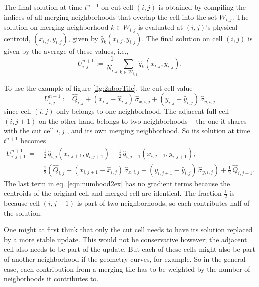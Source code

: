 \begin{enumerate}
\vspace*{.1in}
The final solution at time $t^{n+1}$ on cut cell $(i,j)$ is obtained by compiling the 
indices of all merging neighborhoods that overlap the cell  into the set $W_{i,j}$.
The solution on merging neighborhood $k \in W_{i,j}$ is evaluated at $(i,j)$'s 
physical centroid, $(x_{i,j},y_{i,j})$, given by $\hat{q}_{k}(x_{i,j},y_{i,j})$.  
The final solution on cell $(i,j)$ is given by the average of these values, i.e.,
\begin{equation} \label{eq:final_update_linear}
U^{n+1}_{i,j} := \frac{1}{N_{i,j}}\sum_{k \in W_{i,j}}\hat{q}_{k}(x_{i,j},y_{i,j}).
\end{equation}

To use the example of figure \ref{fig:2nborTile}, the cut cell value
\begin{equation}
   U_{i,j}^{n+1} := \widehat{Q}_{i,j} 
   + ( x_{i,j} - \widehat x_{i,j}) \, \widehat{\sigma}_{x,i,j}
   + ( y_{i,j} - \widehat y_{i,j}) \, \widehat{\sigma}_{y,i,j}
\end{equation}
since cell $(i,j)$ only belongs to one neighborhood. The adjacent full cell
$(i,j+1)$ on the other hand belongs to two neighborhoods -- the one it shares with
the cut cell $i,j$ , and its own merging neighborhood.
So its solution at time $t^{n+1}$  becomes
\begin{equation}
\label{eqn:numhood2ex}
\begin{split}
   U_{i,j+1}^{n+1} \,=\, & \frac{1}{2} \, \widehat{q}_{i,j}(x_{i,j+1},y_{i,j+1})+ 
   \frac{1}{2} \,  \widehat{q}_{i,j+1}(x_{i,j+1},y_{i,j+1}), \\
   = &\frac{1}{2} \left
   (\widehat{Q}_{i,j} 
   + ( x_{i,j+1} - \widehat x_{i,j}) \, \widehat{\sigma}_{x,i,j}
   + ( y_{i,j+1} - \widehat y_{i,j}) \, \widehat{\sigma}_{y,i,j} \right ) + 
   \frac{1}{2} \, \widehat{Q}_{i,j+1} .
\end{split}
\end{equation}
The last term  in eq. \eqref{eqn:numhood2ex} has no gradient terms because the
centroids of the original cell and merged cell are identical.
The fraction $\frac{1}{2}$ is because cell $(i,j+1)$ is part of  two
neighborhoods, so each contributes half of the solution.
\end{enumerate}

One might at first think that only the cut cell needs to have its solution replaced
by a more stable update.  This would not be conservative however; the adjacent cell
also needs to be part of the update. But each of these cells might also be part of
another neighborhood if the geometry curves, for example. So in the general case,
each contribution from a merging tile has to be weighted by the number of
neigborhoods it contributes to. 



